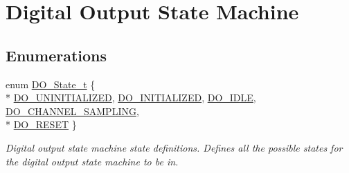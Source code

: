 \hypertarget{group__do__statemachine}{\section{Digital Output State Machine}
\label{group__do__statemachine}
}
\subsection*{Enumerations}
\begin{DoxyCompactItemize}
\item 
enum \hyperlink{group__do__statemachine_ga88f6f2ae56f37cde9afdfcd93591e119}{D\-O\-\_\-\-State\-\_\-t} \{ \\*
\hyperlink{group__do__statemachine_gga88f6f2ae56f37cde9afdfcd93591e119adcb9d080c1c9c327c8146eb5e691e6ee}{D\-O\-\_\-\-U\-N\-I\-N\-I\-T\-I\-A\-L\-I\-Z\-E\-D}, 
\hyperlink{group__do__statemachine_gga88f6f2ae56f37cde9afdfcd93591e119a8986f42023508bfe1fb3ed8a3ce57645}{D\-O\-\_\-\-I\-N\-I\-T\-I\-A\-L\-I\-Z\-E\-D}, 
\hyperlink{group__do__statemachine_gga88f6f2ae56f37cde9afdfcd93591e119a4dde3b6c7080f7f723c3127b79e53e1e}{D\-O\-\_\-\-I\-D\-L\-E}, 
\hyperlink{group__do__statemachine_gga88f6f2ae56f37cde9afdfcd93591e119a3265a3094198820b0360abb5dd57508b}{D\-O\-\_\-\-C\-H\-A\-N\-N\-E\-L\-\_\-\-S\-A\-M\-P\-L\-I\-N\-G}, 
\\*
\hyperlink{group__do__statemachine_gga88f6f2ae56f37cde9afdfcd93591e119a4165bc81d865b678b2f9b7410eed6018}{D\-O\-\_\-\-R\-E\-S\-E\-T}
 \}
\begin{DoxyCompactList}\small\item\em Digital output state machine state definitions. Defines all the possible states for the digital output state machine to be in. \end{DoxyCompactList}\end{DoxyCompactItemize}
